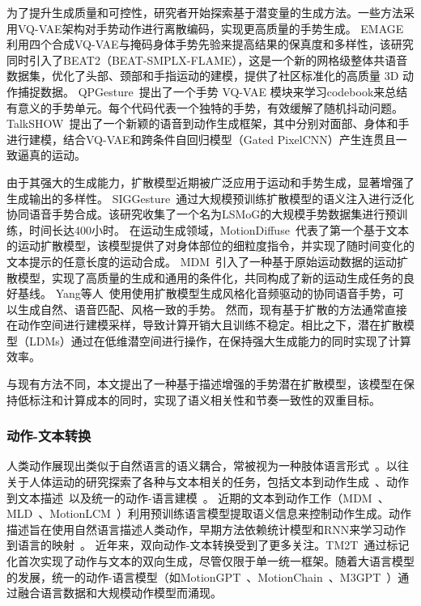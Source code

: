 为了提升生成质量和可控性，研究者开始探索基于潜变量的生成方法。一些方法采用VQ-VAE架构对手势动作进行离散编码，实现更高质量的手势生成。
EMAGE~\cite{liu2024emage} 利用四个合成VQ-VAE与掩码身体手势先验来提高结果的保真度和多样性，该研究同时引入了BEAT2（BEAT-SMPLX-FLAME），这是一个新的网格级整体共语音数据集，优化了头部、颈部和手指运动的建模，提供了社区标准化的高质量 3D 动作捕捉数据。
QPGesture~\cite{yang2023qpgesture}提出了一个手势 VQ-VAE 模块来学习codebook来总结有意义的手势单元。每个代码代表一个独特的手势，有效缓解了随机抖动问题。
TalkSHOW~\cite{yi2023generating}提出了一个新颖的语音到动作生成框架，其中分别对面部、身体和手进行建模，结合VQ-VAE和跨条件自回归模型（Gated PixelCNN）产生连贯且一致逼真的运动。

由于其强大的生成能力，扩散模型\cite{cheng2024siggesture,alexanderson2023listen,tevet2022mdm,yang2023diffusestylegesture}近期被广泛应用于运动和手势生成，显著增强了生成输出的多样性。
SIGGesture~\cite{cheng2024siggesture}通过大规模预训练扩散模型的语义注入进行泛化协同语音手势合成。该研究收集了一个名为LSMoG的大规模手势数据集进行预训练，时间长达400小时。
在运动生成领域，MotionDiffuse~\cite{zhang2024motiondiffuse}代表了第一个基于文本的运动扩散模型，该模型提供了对身体部位的细粒度指令，并实现了随时间变化的文本提示的任意长度的运动合成。
MDM~\cite{tevet2022mdm}引入了一种基于原始运动数据的运动扩散模型，实现了高质量的生成和通用的条件化，共同构成了新的运动生成任务的良好基线。
Yang等人~\cite{yang2023diffusestylegesture}使用使用扩散模型生成风格化音频驱动的协同语音手势，可以生成自然、语音匹配、风格一致的手势。
然而，现有基于扩散的方法通常直接在动作空间进行建模采样，导致计算开销大且训练不稳定。相比之下，潜在扩散模型（LDMs）\cite{rombach2022high}通过在低维潜空间进行操作，在保持强大生成能力的同时实现了计算效率。

与现有方法不同，本文提出了一种基于描述增强的手势潜在扩散模型，该模型在保持低标注和计算成本的同时，实现了语义相关性和节奏一致性的双重目标。

\subsubsection{动作-文本转换}
人类动作展现出类似于自然语言的语义耦合，常被视为一种肢体语言形式~\cite{jiang2024motiongpt}。以往关于人体运动的研究探索了各种与文本相关的任务，包括文本到动作生成~\cite{tevet2022mdm,guo2022humanml3d}、动作到文本描述~\cite{jiang2024motiongpt,guo2022tm2t}以及统一的动作-语言建模~\cite{tevet2022motionclip,jiang2024motiongpt,jiang2024motionchain}。
近期的文本到动作工作（MDM~\cite{tevet2022mdm}、MLD~\cite{chen2023executing}、MotionLCM~\cite{dai2024motionlcm}）利用预训练语言模型提取语义信息来控制动作生成。动作描述旨在使用自然语言描述人类动作，早期方法依赖统计模型和RNN来学习动作到语言的映射~\cite{takano2015statistical, yamada2018paired}。
近年来，双向动作-文本转换受到了更多关注。TM2T~\cite{guo2022tm2t}通过标记化首次实现了动作与文本的双向生成，尽管仅限于单一统一框架。随着大语言模型的发展，统一的动作-语言模型（如MotionGPT~\cite{jiang2024motiongpt}、MotionChain~\cite{jiang2024motionchain}、M3GPT~\cite{luo2024m}）通过融合语言数据和大规模动作模型而涌现。


